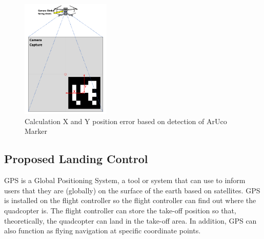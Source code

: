 \documentclass[a4paper]{jpconf}
\begin{document}
\begin{figure}[h]
    \centering
    \includegraphics[width=10pc]{camera-capture-ArUco.png}\hspace{2pc}%
    \begin{minipage}[b]{14pc}\caption{\label{label}Calculation X and Y position error based on detection of ArUco Marker}
    \end{minipage}
\end{figure}

\subsection{Proposed Landing Control}
GPS is a Global Positioning System, a tool or system that can use to inform users that they are (globally) on the surface of the earth based on satellites. GPS is installed on the flight controller so the flight controller can find out where the quadcopter is. The flight controller can store the take-off position so that, theoretically, the quadcopter can land in the take-off area. In addition, GPS can also function as flying navigation at specific coordinate points.
\end{document}
